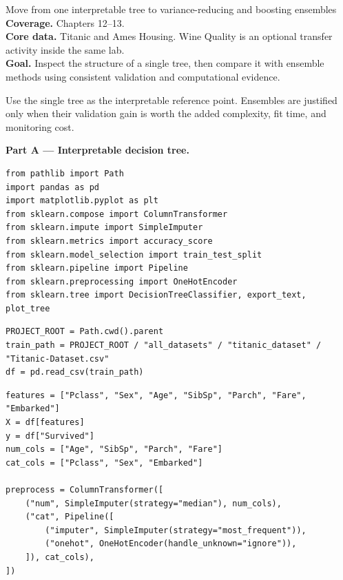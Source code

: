 
\begin{labproject}{Move from one interpretable tree to variance-reducing and boosting ensembles}
\textbf{Coverage.} Chapters 12--13.\\
\textbf{Core data.} Titanic and Ames Housing. Wine Quality is an optional transfer activity inside the same lab.\\
\textbf{Goal.} Inspect the structure of a single tree, then compare it with ensemble methods using consistent validation and computational evidence.

\begin{labmode}
Use the single tree as the interpretable reference point. Ensembles are justified only when their validation gain is worth the added complexity, fit time, and monitoring cost.
\end{labmode}

\medskip\noindent\textbf{Part A --- Interpretable decision tree.}\par
\begin{lstlisting}[style=mlpython]
from pathlib import Path
import pandas as pd
import matplotlib.pyplot as plt
from sklearn.compose import ColumnTransformer
from sklearn.impute import SimpleImputer
from sklearn.metrics import accuracy_score
from sklearn.model_selection import train_test_split
from sklearn.pipeline import Pipeline
from sklearn.preprocessing import OneHotEncoder
from sklearn.tree import DecisionTreeClassifier, export_text, plot_tree
\end{lstlisting}

\begin{lstlisting}[style=mlpython]
PROJECT_ROOT = Path.cwd().parent
train_path = PROJECT_ROOT / "all_datasets" / "titanic_dataset" / "Titanic-Dataset.csv"
df = pd.read_csv(train_path)
\end{lstlisting}

\begin{lstlisting}[style=mlpython]
features = ["Pclass", "Sex", "Age", "SibSp", "Parch", "Fare", "Embarked"]
X = df[features]
y = df["Survived"]
num_cols = ["Age", "SibSp", "Parch", "Fare"]
cat_cols = ["Pclass", "Sex", "Embarked"]

preprocess = ColumnTransformer([
    ("num", SimpleImputer(strategy="median"), num_cols),
    ("cat", Pipeline([
        ("imputer", SimpleImputer(strategy="most_frequent")),
        ("onehot", OneHotEncoder(handle_unknown="ignore")),
    ]), cat_cols),
])


\end{lstlisting}
\end{labproject}
